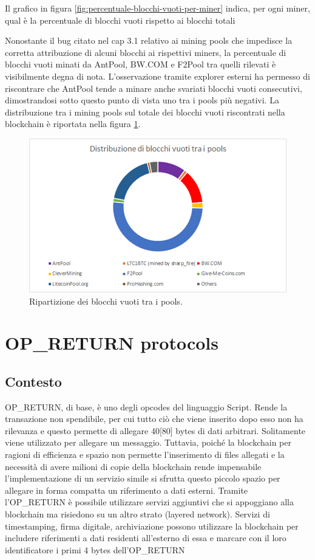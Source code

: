 Il grafico in figura \ref*{fig:percentuale-blocchi-vuoti-per-miner} indica, per ogni miner, qual è la percentuale di blocchi vuoti rispetto ai blocchi totali

Nonostante il bug citato nel cap 3.1 relativo ai mining pools che impedisce la corretta attribuzione di alcuni blocchi ai rispettivi miners, la percentuale di blocchi vuoti minati da AntPool, BW.COM e F2Pool tra quelli rilevati è visibilmente degna di nota. L’osservazione tramite explorer esterni \cite{chainso,litecoinpool} ha permesso di riscontrare che AntPool tende a minare anche svariati blocchi vuoti consecutivi, dimostrandosi sotto questo punto di vista uno tra i pools più negativi.
La distribuzione tra i mining pools sul totale dei blocchi vuoti riscontrati nella blockchain è riportata nella figura \ref{fig:distribuzione-blocchivuoti-ring}.

\begin{figure}[h!]
	\centering
	\includegraphics[width=1.0\linewidth]{images/distribuzione-blocchivuoti-ring}
	\caption{Ripartizione dei blocchi vuoti tra i pools.}
	\label{fig:distribuzione-blocchivuoti-ring}
\end{figure}


\section{OP\_RETURN protocols}
\subsection{Contesto}
OP\_RETURN, di base, è uno degli opcodes del linguaggio Script. Rende la transazione non spendibile, per cui tutto ciò che viene inserito dopo esso non ha rilevanza e questo permette di allegare 40[80] bytes di dati arbitrari. Solitamente viene utilizzato per allegare un messaggio. Tuttavia, poiché la blockchain per ragioni di efficienza e spazio non permette l’inserimento di files allegati e la necessità di avere milioni di copie della blockchain rende impensabile l’implementazione di un servizio simile si sfrutta questo piccolo spazio per allegare in forma compatta un riferimento a dati esterni.
Tramite l’OP\_RETURN è possibile utilizzare servizi aggiuntivi che si appoggiano alla blockchain ma risiedono su un altro strato (layered network). Servizi di timestamping, firma digitale, archiviazione possono utilizzare la blockchain per includere riferimenti a dati residenti all’esterno di essa e marcare con il loro identificatore i primi 4 bytes dell’OP\_RETURN

